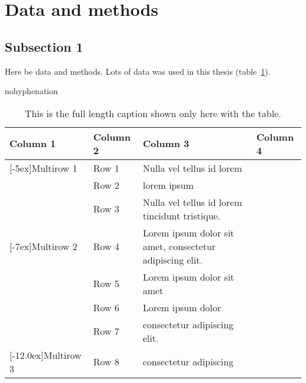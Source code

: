 \section{Data and methods}
\subsection{Subsection 1}
\justify
Here be data and methods. Lots of data was used in this thesis (table~\ref{tab:example_table}).

\begin{hyphenrules}{nohyphenation}
    \begin{table}[H]
        \centering
        \caption[This is table name for list of contents]{This is the full length caption shown only here with the table.} 
        \label{tab:example_table}
        \def\arraystretch{1.2}
        \setlength\tabcolsep{1.2ex}
        \begin{tabular}{ @{} >{\raggedright\arraybackslash}p{2.5cm} >{\raggedright\arraybackslash}p{3cm} >{\raggedright\arraybackslash}p{4cm} >{\raggedleft\arraybackslash}p{3cm} @{} }
            \toprule
            Column 1 & Column 2 & Column 3 & Column 4 \\
            \midrule
            \multirow{3}{*}[-5ex]{Multirow 1} & Row 1 & Nulla vel tellus id lorem & \cite{Geurs2004} \\
            & Row 2 & lorem ipsum & \cite{Geurs2004} \\
            & Row 3 & Nulla vel tellus id lorem tincidunt tristique. & \cite{Geurs2004} \\
            \greyrule
            \multirow{4}{*}[-7ex]{Multirow 2} & Row 4 & Lorem ipsum dolor sit amet, consectetur adipiscing elit. & \cite{Geurs2004} \\
            & Row 5 & Lorem ipsum dolor sit amet & \cite{Geurs2004} \\
            & Row 6 & Lorem ipsum dolor & \cite{Geurs2004} \\
            & Row 7 & consectetur adipiscing elit. & \cite{Geurs2004} \\
            \greyrule
            \multirow{4}{*}[-12.0ex]{Multirow 3} & Row 8 & consectetur adipiscing & \cite{Geurs2004} \\

\end{tabular}
\end{table}
\end{hyphenrules}
